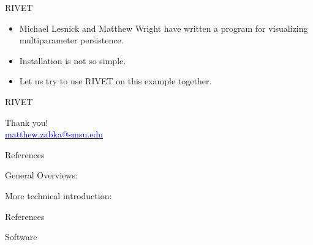 \documentclass[usenames,dvipsnames,aspectratio=1610]{beamer}
\begin{document}

\begin{frame}{RIVET}
\begin{itemize}
\item Michael Lesnick and Matthew Wright have written a program for visualizing multiparameter persistence.
\item Installation is not so simple.
\item Let us try to use RIVET on this example together.
\end{itemize}
\end{frame}


\begin{frame}{RIVET}
\begin{center}
{\Huge Thank you!}\\

\href{mailto:matthew.zabka@smsu.edu}{\textcolor{blue}{matthew.zabka@smsu.edu}}
\end{center}
\end{frame}


\begin{frame}{References}
\nocite{ghrist2017homological, bubenik_statistical_2015, carlsson_topology_2009,
oudot2015persistence, perea_brief_2018, wright}

\renewcommand*{\bibfont}{\small}
General Overviews:
\printbibliography[keyword=intro]

More technical introduction:
\printbibliography[keyword=nintro]

\end{frame}
\begin{frame}{References}
\nocite{Wolcott2016InteractiveJPDwB, bauer2017ripser, lesnick2015interactive}

Software
\printbibliography[keyword=software]
\end{frame}
\end{document}
